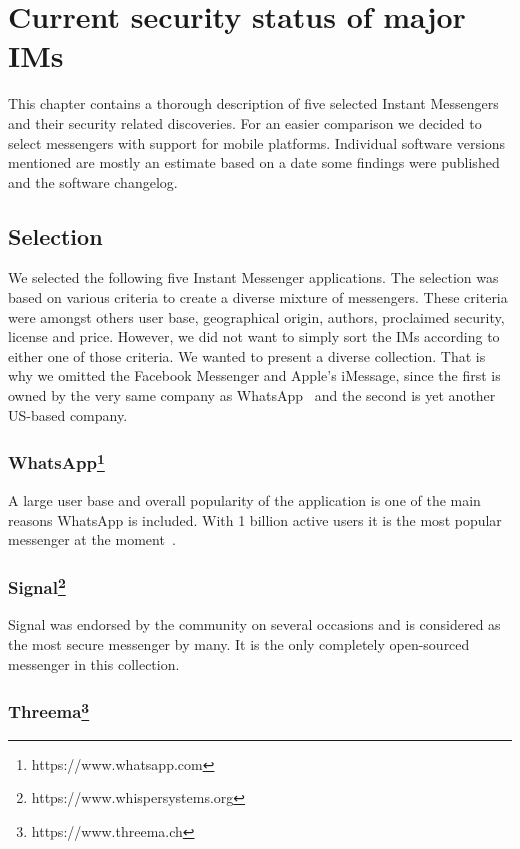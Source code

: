 \documentclass[thesis=M,english]{FITthesis}[2012/10/20]
\begin{document}
\chapter{Current security status of major IMs}\label{compar}

This chapter contains a thorough description of five selected Instant Messengers and their security related discoveries. For an easier comparison we decided to select messengers with support for mobile platforms. Individual software versions mentioned are mostly an estimate based on a date some findings were published and the software changelog.

\section{Selection}

We selected the following five Instant Messenger applications. The selection was based on various criteria to create a diverse mixture of messengers. These criteria were amongst others user base, geographical origin, authors, proclaimed security, license and price. However, we did not want to simply sort the IMs according to either one of those criteria. We wanted to present a diverse collection. That is why we omitted the Facebook Messenger and Apple's iMessage, since the first is owned by the very same company as WhatsApp~\cite{facebookwhatsappbuy} and the second is yet another US-based company.


\subsection{WhatsApp\protect\footnote{https://www.whatsapp.com}}

A large user base and overall popularity of the application is one of the main reasons WhatsApp is included. With 1 billion active users it is the most popular messenger at the moment~\cite{whatsappusers}.

\subsection{Signal\protect\footnote{https://www.whispersystems.org}}

Signal was endorsed by the community on several occasions and is considered as the most secure messenger by many. It is the only completely open-sourced messenger in this collection.

\subsection{Threema\protect\footnote{https://www.threema.ch}}
\end{document}
